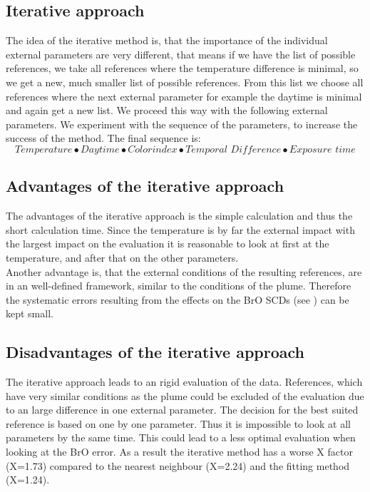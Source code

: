 \documentclass  [
  paper    = a4,
  BCOR     = 10mm,
  twoside,
  fontsize = 12pt,
  fleqn,
  toc      = bibnumbered,
  toc      = listofnumbered,
  numbers  = noendperiod,
  headings = normal,
  listof   = leveldown,
  version  = 3.03
]                                       {scrreprt}
\begin{document}
	\subsection{Iterative approach}

	The idea of the iterative method is, that the importance of the individual external parameters are very different, that means if we have the list of possible references, we take all references where the temperature difference is minimal, so we get a new, much smaller list of possible references. From this list we choose all references where the next external parameter for example the daytime is minimal and again get a new list. We proceed this way with the following external parameters. We experiment with the sequence of the parameters, to increase the success of the method. The final sequence is:
	\begin{equation*}
	Temperature \bullet  Daytime  \bullet Colorindex \bullet Temporal\,\, Difference \bullet Exposure \,\, time
	\end{equation*} 
	\subsection*{Advantages of the iterative approach}
	The advantages of the iterative approach is the simple calculation and thus the short calculation time. Since the temperature is by far the external impact with the largest impact on the evaluation it is reasonable to look at first at the temperature, and after that on the other parameters. \\
	Another advantage is, that the external conditions of the resulting references, are in an well-defined framework, similar to the  conditions of the plume. Therefore the systematic errors resulting from the effects on the BrO SCDs (see ) can be kept small.
	\subsection*{Disadvantages of the iterative approach}
	The iterative approach leads to an rigid evaluation of the data. References, which have very similar conditions as the plume could be excluded of the evaluation due to an large difference in one external parameter. The decision for the best suited reference is based on one by one parameter. Thus it is impossible to look at all parameters by the same time.   This could lead to a less optimal evaluation when looking at the BrO error.
	As a result the iterative method has a worse X factor (X=1.73) compared to the nearest neighbour (X=2.24) and the fitting method (X=1.24).
	
\end{document}
